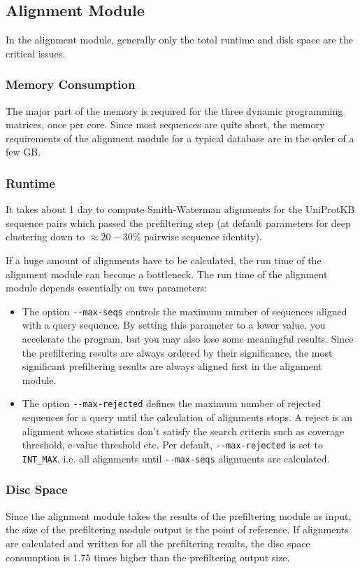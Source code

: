 \documentclass[11pt,a4paper]{scrreprt}
\begin{document}
\subsection{Alignment Module}
In the alignment module, generally only the total runtime and disk space are the critical issues.
\subsubsection{Memory Consumption}
The major part of the memory is required for the three dynamic programming matrices, once per core. Since most sequences are quite short, the memory requirements of the alignment module for a typical database are in the order of a few GB. 
\subsubsection{Runtime}
It takes about 1 day to compute Smith-Waterman alignments for the UniProtKB sequence pairs which passed the prefiltering step (at default parameters for deep clustering down to $\approx 20 - 30\%$ pairwise sequence identity).

If a huge amount of alignments have to be calculated, the run time of the alignment module can become a bottleneck. The run time of the alignment module depends essentially on two parameters:
\begin{itemize}
\item The option \texttt{-{}-max-seqs} controls the maximum number of sequences aligned with a query sequence. By setting this parameter to a lower value, you accelerate the program, but you may also lose some meaningful results. Since the prefiltering results are always ordered by their significance, the most significant prefiltering results are always aligned first in the alignment module.
\item The option \texttt{-{}-max-rejected} defines the maximum number of rejected sequences for a query until the calculation of alignments stops. A reject is an alignment whose statistics don't satisfy the search criteria such as coverage threshold, e-value threshold etc. Per default, \texttt{-{}-max-rejected} is set to \texttt{INT\_MAX}, i.e. all alignments until \texttt{-{}-max-seqs} alignments are calculated.
\end{itemize}
\subsubsection{Disc Space}
Since the alignment module takes the results of the prefiltering module as input, the size of the prefiltering module output is the point of reference. If alignments are calculated and written for all the prefiltering results, the disc space consumption is $1.75$ times higher than the prefiltering output size.
\end{document}
